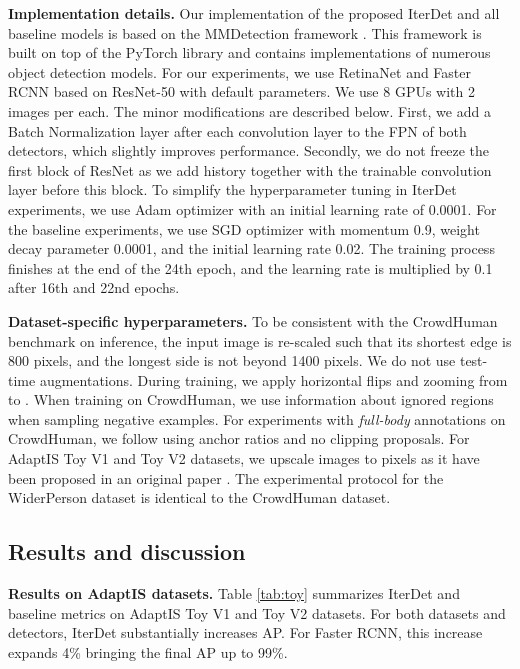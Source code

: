 \documentclass[runningheads]{llncs}
\begin{document}
\textbf{Implementation details.} Our implementation of the proposed IterDet and all baseline models is based on the MMDetection framework \cite{mmdetection}. This framework is built on top of the PyTorch library \cite{paszke2019pytorch} and contains implementations of numerous object detection models. For our experiments, we use RetinaNet and Faster RCNN based on ResNet-50 with default parameters. We use 8 GPUs with 2 images per each. 
The minor modifications are described below. First, we add a Batch Normalization layer after each convolution layer to the FPN of both detectors, which slightly improves performance. Secondly, we do not freeze the first block of ResNet as we add history together with the trainable convolution layer before this block. 
To simplify the hyperparameter tuning in IterDet experiments, we use Adam optimizer with an initial learning rate of 0.0001. For the baseline experiments, we use SGD optimizer with momentum 0.9, weight decay parameter 0.0001, and the initial learning rate 0.02. The training process finishes at the end of the 24th epoch, and the learning rate is multiplied by 0.1 after 16th and 22nd epochs.

\textbf{Dataset-specific hyperparameters.} To be consistent with the CrowdHuman benchmark on inference, the input image is re-scaled such that its shortest edge is 800 pixels, and the longest side is not beyond 1400 pixels. We do not use test-time augmentations. During training, we apply horizontal flips and zooming from  to . When training on CrowdHuman, we use information about ignored regions when sampling negative examples. For experiments with \emph{full-body} annotations on CrowdHuman, we follow \cite{shao2018crowdhuman,ge2020ps,liu2019adaptive} using  anchor ratios and no clipping proposals. For AdaptIS Toy V1 and Toy V2 datasets, we upscale images to  pixels as it have been proposed in an original paper \cite{sofiiuk2019adaptis}. The experimental protocol for the WiderPerson dataset is identical to the CrowdHuman dataset.

\subsection{Results and discussion}

\textbf{Results on AdaptIS datasets.} Table \ref{tab:toy} summarizes IterDet and baseline metrics on AdaptIS Toy V1 and Toy V2 datasets. For both datasets and detectors, IterDet substantially increases AP. For Faster RCNN, this increase expands 4\% bringing the final AP up to 99\%.
\end{document}
